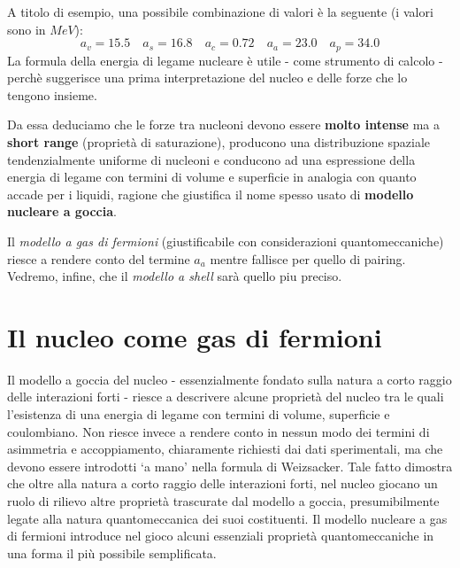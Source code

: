 A titolo di esempio, una possibile combinazione di valori è la seguente (i
valori sono in \(MeV\)):
\begin{equation}
	a_{v} = 15.5 \quad a_{s} = 16.8 \quad a_{c} = 0.72 \quad a_{a} = 23.0 \quad a_{p} = 34.0
	\label{eq:typical-values-drop-model}
\end{equation}
La formula della energia di legame nucleare è utile - come strumento di
calcolo - perchè suggerisce una prima interpretazione del nucleo e delle
forze che lo tengono insieme.

Da essa deduciamo che le forze tra nucleoni devono essere \textbf{molto
	intense} ma a \textbf{short range} (proprietà di saturazione), producono
una distribuzione spaziale tendenzialmente uniforme di nucleoni e
conducono ad una espressione della energia di legame con termini di
volume e superficie in analogia con quanto accade per i liquidi, ragione
che giustifica il nome spesso usato di \textbf{modello nucleare a
	goccia}.

Il \emph{modello a gas di fermioni} (giustificabile con considerazioni
quantomeccaniche) riesce a rendere conto del termine \(a_{a}\) mentre
fallisce per quello di pairing.
Vedremo, infine, che il \emph{modello a shell} sarà quello piu preciso.

\section{Il nucleo come gas di fermioni}\label{sec:il-nucleo-come-gas-di-fermioni}



Il modello a goccia del nucleo - essenzialmente fondato sulla natura a corto raggio delle interazioni forti - riesce a descrivere alcune proprietà del nucleo tra le quali l’esistenza di una energia di legame con termini di volume, superficie e coulombiano.
Non riesce invece a rendere conto in nessun modo dei termini di asimmetria e accoppiamento, chiaramente richiesti dai dati sperimentali, ma che devono essere introdotti ‘a mano’ nella formula di Weizsacker.
Tale fatto dimostra che oltre alla natura a corto raggio delle interazioni forti, nel nucleo giocano un ruolo di rilievo altre proprietà trascurate dal modello a goccia, presumibilmente legate alla natura quantomeccanica dei suoi costituenti.
Il modello nucleare a gas di fermioni introduce nel gioco alcuni essenziali proprietà quantomeccaniche in una forma il più possibile semplificata.

